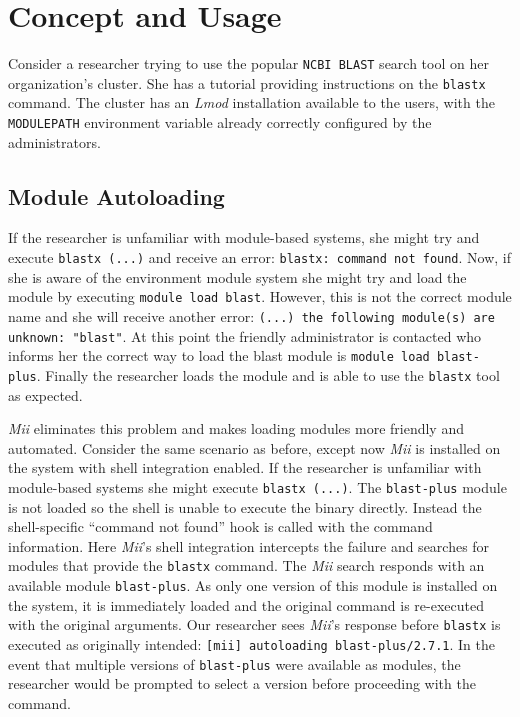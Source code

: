 \documentclass[manuscript,screen]{acmart}
\begin{document}
\section{Concept and Usage}

Consider a researcher trying to use the popular \texttt{NCBI BLAST} search tool on her organization’s cluster. She
has a tutorial providing instructions on the \texttt{blastx} command. The cluster has an \textit{Lmod} installation
available to the users, with the \texttt{MODULEPATH} environment variable already correctly configured by the administrators.

\subsection{Module Autoloading}

If the researcher is unfamiliar with module-based systems, she might try and execute \texttt{blastx (...)} and
receive an error: \texttt{blastx: command not found}. Now, if she is aware of the environment module system she
might try and load the module by executing \texttt{module load blast}. However, this is not the correct module
name and she will receive another error: \texttt{(...) the following module(s) are unknown: "blast"}. At this
point the friendly administrator is contacted who informs her the correct way to load the blast module is
\texttt{module load blast-plus}. Finally the researcher loads the module and is able to use the \texttt{blastx} tool as
expected.

\par

\textit{Mii} eliminates this problem and makes loading modules more friendly and automated. Consider the same
scenario as before, except now \textit{Mii} is installed on the system with shell integration enabled. If the researcher
is unfamiliar with module-based systems she might execute \texttt{blastx (...)}. The \texttt{blast-plus} module is
not loaded so the shell is unable to execute the binary directly. Instead the shell-specific “command not
found” hook is called with the command information. Here \textit{Mii}’s shell integration intercepts the failure
and searches for modules that provide the \texttt{blastx} command. The \textit{Mii} search responds with an available
module \texttt{blast-plus}. As only one version of this module is installed on the system, it is immediately loaded
and the original command is re-executed with the original arguments. Our researcher sees \textit{Mii}’s response
before \texttt{blastx} is executed as originally intended: \texttt{[mii] autoloading blast-plus/2.7.1}. In the event that
multiple versions of \texttt{blast-plus} were available as modules, the researcher would be prompted to select a
version before proceeding with the command.
\end{document}
